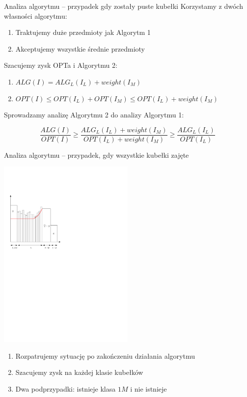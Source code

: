 \documentclass{beamer}
\begin{document}
\begin{frame}{Analiza algorytmu -- przypadek gdy zostały puste kubełki}
  Korzystamy z dwóch własności algorytmu:
  \begin{enumerate}
    \item Traktujemy duże przedmioty jak Algorytm 1
    \item Akceptujemy wszystkie średnie przedmioty
  \end{enumerate}


  Szacujemy zysk OPTa i Algorytmu 2:
  
  \begin{enumerate}
  \item $ALG(I) = ALG_L(I_L) + weight(I_M)$
  \item $OPT(I) \leq OPT(I_L) + OPT(I_M) \leq OPT(I_L)+weight(I_M)$
  \end{enumerate}

  Sprowadzamy analizę Algorytmu 2 do analizy Algorytmu 1:
  
   $$ \frac{ALG(I)}{OPT(I)} \geq \frac{ALG_L(I_L) + weight(I_M)}{OPT(I_L) +weight(I_M)} \geq \frac{ALG_L(I_L)}{OPT(I_L)}$$
\end{frame}

\begin{frame}{Analiza algorytmu -- przypadek, gdy wszystkie kubełki zajęte}
  \begin{center}
    \includegraphics[width=0.5\textwidth]{figs/classes.pdf}
    \end{center}

  \begin{enumerate}
    \item Rozpatrujemy sytuację po zakończeniu działania algorytmu
    \item Szacujemy zysk na każdej klasie kubełków
    \item Dwa podprzypadki: istnieje klasa $1M$ i nie istnieje
  \end{enumerate}
\end{frame}
\end{document}

